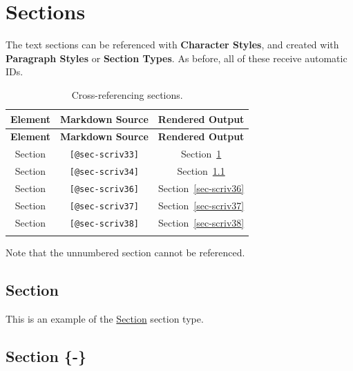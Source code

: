 \documentclass[
  12pt,
  a4paper,
  oneside,
  numbers=noenddot,
  titlepage,
  toclink=all,
  toc=bibliography]{scrbook}
\theoremstyle{definition}
\theoremstyle{definition}
\theoremstyle{definition}
\theoremstyle{plain}
\theoremstyle{plain}
\theoremstyle{plain}
\theoremstyle{plain}
\theoremstyle{plain}
\theoremstyle{remark}
\begin{document}
\newpage{}

\hypertarget{sec-scriv33}{%
\section{Sections}\label{sec-scriv33}}

The text sections can be referenced with \textbf{Character Styles}, and
created with \textbf{Paragraph Styles} or \textbf{Section Types}. As
before, all of these receive automatic IDs.

\hypertarget{tbl-scriv33}{}
\begin{longtable}[]{@{}ccc@{}}
\toprule\noalign{}
\textbf{Element} & \textbf{Markdown Source} & \textbf{Rendered
Output} \\
\midrule\noalign{}
\endfirsthead
\toprule\noalign{}
\textbf{Element} & \textbf{Markdown Source} & \textbf{Rendered
Output} \\
\midrule\noalign{}
\endhead
\bottomrule\noalign{}
\endlastfoot
Section & \texttt{{[}@sec-scriv33{]}} &
\protect\hypertarget{cite_89}{}{\label{cite_89}Section~\ref{sec-scriv33}} \\
Section & \texttt{{[}@sec-scriv34{]}} &
\protect\hypertarget{cite_90}{}{\label{cite_90}Section~\ref{sec-scriv34}} \\
Section & \texttt{{[}@sec-scriv36{]}} &
\protect\hypertarget{cite_91}{}{\label{cite_91}Section~\ref{sec-scriv36}} \\
Section & \texttt{{[}@sec-scriv37{]}} &
\protect\hypertarget{cite_92}{}{\label{cite_92}Section~\ref{sec-scriv37}} \\
Section & \texttt{{[}@sec-scriv38{]}} &
\protect\hypertarget{cite_93}{}{\label{cite_93}Section~\ref{sec-scriv38}} \\
\caption{\label{tbl-scriv33}Cross-referencing sections.}\tabularnewline
\end{longtable}

Note that the unnumbered section cannot be referenced.

\hypertarget{sec-scriv34}{%
\subsection{Section}\label{sec-scriv34}}

This is an example of the \ul{Section} section type.

\hypertarget{sec-scriv35}{%
\subsection*{Section \{-\}}\label{sec-scriv35}}
\end{document}
